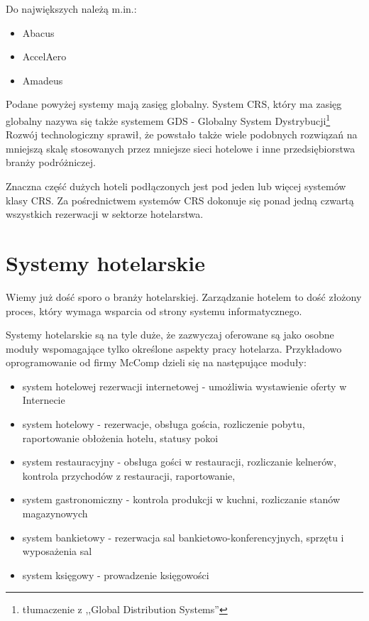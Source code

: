 \documentclass[a4paper,onecolumn,oneside,11pt,wide,floatssmall]{mwrep}
\theoremstyle{definition}
\theoremstyle{plain}%
\theoremstyle{remark}
\begin{document}
Do największych należą m.in.:
\begin{itemize}
\item Abacus
\item AccelAero
\item Amadeus
\end{itemize}

Podane powyżej systemy mają zasięg globalny. System CRS, który ma zasięg 
globalny nazywa się także systemem GDS - Globalny System Dystrybucji\footnote
{tłumaczenie z ,,Global Distribution Systems''} Rozwój technologiczny 
sprawił, że powstało także wiele podobnych rozwiązań na mniejszą skalę 
stosowanych przez mniejsze sieci hotelowe i inne przedsiębiorstwa branży 
podróżniczej. 

Znaczna część dużych hoteli podłączonych jest pod jeden lub więcej systemów 
klasy CRS. Za pośrednictwem systemów CRS dokonuje się ponad jedną czwartą wszystkich 
rezerwacji w sektorze hotelarstwa.

\section{Systemy hotelarskie}
Wiemy już dość sporo o branży hotelarskiej. Zarządzanie hotelem to dość złożony proces, który wymaga wsparcia od strony systemu informatycznego.

Systemy hotelarskie są na tyle duże, że zazwyczaj oferowane są jako osobne moduły wspomagające tylko określone aspekty pracy hotelarza. Przykładowo oprogramowanie od firmy McComp dzieli się na następujące moduły:

\begin{itemize}
  \item system hotelowej rezerwacji internetowej - umożliwia wystawienie oferty w Internecie
  \item system hotelowy - rezerwacje, obsługa gościa, rozliczenie pobytu, raportowanie obłożenia hotelu, statusy pokoi
  \item system restauracyjny - obsługa gości w restauracji, rozliczanie kelnerów, kontrola przychodów z restauracji, raportowanie,
  \item system gastronomiczny - kontrola produkcji w kuchni, rozliczanie stanów magazynowych
  \item system bankietowy - rezerwacja sal bankietowo-konferencyjnych, sprzętu i wyposażenia sal
  \item system księgowy - prowadzenie księgowości
\end{itemize}
\end{document}
